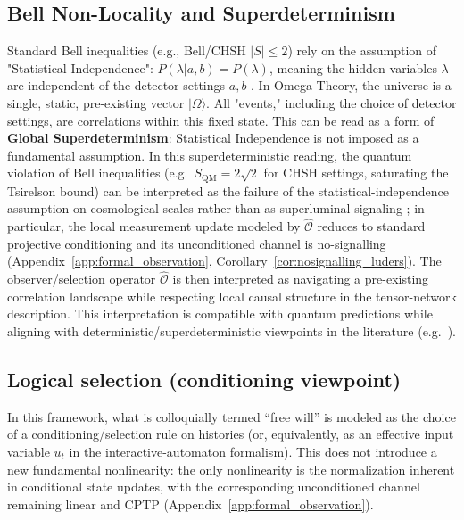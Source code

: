\subsection{Bell Non-Locality and Superdeterminism}
Standard Bell inequalities (e.g., Bell/CHSH $|S| \le 2$) rely on the assumption of "Statistical Independence": $P(\lambda | a, b) = P(\lambda)$, meaning the hidden variables $\lambda$ are independent of the detector settings $a, b$ \cite{Bell1964,CHSH1969,Brunner2014BellNonlocality}.
In Omega Theory, the universe is a single, static, pre-existing vector $|\Omega\rangle$. All "events," including the choice of detector settings, are correlations within this fixed state. This can be read as a form of \textbf{Global Superdeterminism}: Statistical Independence is not imposed as a fundamental assumption.
In this superdeterministic reading, the quantum violation of Bell inequalities (e.g.\ $S_{\text{QM}}=2\sqrt{2}$ for CHSH settings, saturating the Tsirelson bound) can be interpreted as the failure of the statistical-independence assumption on cosmological scales rather than as superluminal signaling \cite{Tsirelson1980}; in particular, the local measurement update modeled by $\hat{\mathcal{O}}$ reduces to standard projective conditioning and its unconditioned channel is no-signalling (Appendix~\ref{app:formal_observation}, Corollary~\ref{cor:nosignalling_luders}). The observer/selection operator $\hat{\mathcal{O}}$ is then interpreted as navigating a pre-existing correlation landscape while respecting local causal structure in the tensor-network description. This interpretation is compatible with quantum predictions while aligning with deterministic/superdeterministic viewpoints in the literature (e.g.\ \cite{Hall2010LocalDeterministic,HossenfelderPalmer2020Superdeterminism,thooft2014cai}).

\subsection{Logical selection (conditioning viewpoint)}
In this framework, what is colloquially termed ``free will'' is modeled as the choice of a conditioning/selection rule on histories (or, equivalently, as an effective input variable $u_t$ in the interactive-automaton formalism). This does not introduce a new fundamental nonlinearity: the only nonlinearity is the normalization inherent in conditional state updates, with the corresponding unconditioned channel remaining linear and CPTP (Appendix~\ref{app:formal_observation}).

